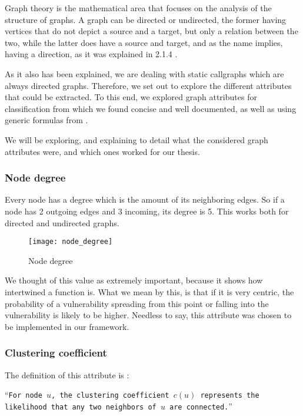 Graph theory \parencite{graphs} is the mathematical area that focuses on the analysis of the structure of graphs. A graph can be directed or undirected, the former having vertices that do not depict a source and a target, but only a relation between the two, while the latter does have a source and target, and as the name implies, having a direction, as it was explained in 2.1.4 .

As it also has been explained, we are dealing with static callgraphs which are always directed graphs. Therefore, we set out to explore the different attributes that could be extracted. To this end, we explored graph attributes for classification from \parencite{graphClassification} which we found concise and well documented, as well as using generic formulas from \parencite{graphs}. 

We will be exploring, and explaining to detail what the considered graph attributes were, and which ones worked for our thesis.

\subsubsection{Node degree}

Every node has a degree which is the amount of its neighboring edges. So if a node has 2 outgoing edges and 3 incoming, its degree is 5. This works both for directed and undirected graphs.

\begin{figure}[!htb]
	\caption{Node degree}
	\centering
	\texttt{[image: node\_degree]}
\end{figure}

We thought of this value as extremely important, because it shows how intertwined a function is. What we mean by this, is that if it is very centric, the probability of a vulnerability spreading from this point or falling into the vulnerability is likely to be higher. Needless to say, this attribute was chosen to be implemented in our framework.

\subsubsection{Clustering coefficient}

The definition of this attribute is :

\enquote{\texttt{For node $u$, the clustering coefficient $c(u)$ represents the likelihood that any two neighbors of $u$ are connected.}}\parencite{graphClassification}

